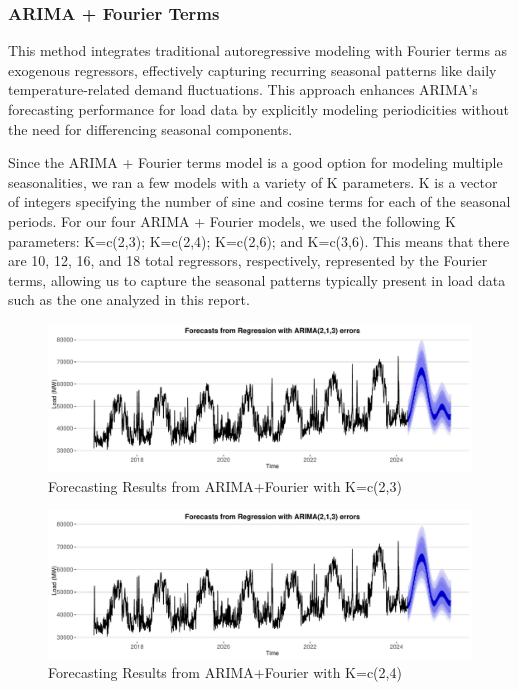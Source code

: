 \documentclass[
]{article}
\begin{document}
\newpage

\subsubsection{ARIMA + Fourier Terms}\label{arima-fourier-terms}

This method integrates traditional autoregressive modeling with Fourier
terms as exogenous regressors, effectively capturing recurring seasonal
patterns like daily temperature-related demand fluctuations. This
approach enhances ARIMA's forecasting performance for load data by
explicitly modeling periodicities without the need for differencing
seasonal components.

Since the ARIMA + Fourier terms model is a good option for modeling
multiple seasonalities, we ran a few models with a variety of K
parameters. K is a vector of integers specifying the number of sine and
cosine terms for each of the seasonal periods. For our four ARIMA +
Fourier models, we used the following K parameters: K=c(2,3); K=c(2,4);
K=c(2,6); and K=c(3,6). This means that there are 10, 12, 16, and 18
total regressors, respectively, represented by the Fourier terms,
allowing us to capture the seasonal patterns typically present in load
data such as the one analyzed in this report.

\begin{figure}
\centering
\includegraphics{FinalProject_Report_files/figure-latex/unnamed-chunk-8-1.pdf}
\caption{Forecasting Results from ARIMA+Fourier with K=c(2,3)}
\end{figure}

\begin{figure}
\centering
\includegraphics{FinalProject_Report_files/figure-latex/unnamed-chunk-9-1.pdf}
\caption{Forecasting Results from ARIMA+Fourier with K=c(2,4)}
\end{figure}
\end{document}
